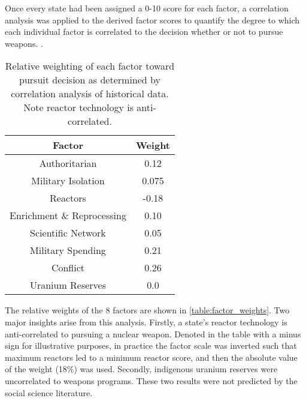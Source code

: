 Once every state had been assigned a 0-10 score for each factor, a correlation analysis was applied to the derived factor scores to quantify the degree to which each individual factor is correlated to the decision whether or not to pursue weapons. .  


\begin{table}
\centering
\begin{tabular}{|c|c|}
\hline
\textbf{Factor}        & \textbf{Weight} \\
\hline
Authoritarian   & 0.12 \\
Military Isolation & 0.075 \\
Reactors           & -0.18 \\
Enrichment \& Reprocessing & 0.10 \\
Scientific Network & 0.05 \\
Military Spending & 0.21 \\
Conflict  & 0.26 \\
Uranium Reserves &  0.0 \\
\hline
\end{tabular}
\caption{Relative weighting of each factor toward pursuit decision as determined by correlation analysis of historical data. Note reactor technology is anti-correlated.}
\label{tab:factor_weights}
\end{table}

The relative weights of the 8 factors are shown in \ref{table:factor_weights}.  Two major insights arise from this analysis. Firstly, a state's reactor technology is anti-correlated to pursuing a nuclear weapon.  Denoted in the table with a minus sign for illustrative purposes, in practice the factor scale was inverted such that maximum reactors led to a minimum reactor score, and then the absolute value of the weight (18\%) was used.  Secondly, indigenous uranium reserves were uncorrelated to weapons programs. These two results were not predicted by the social science literature.



\iffalse
\begin{figure}%
\begin{center}
\texttt{[image: ./figs/signatures\_table.pdf]}
\end{center}
\caption{Table of potential signatures across the fuel cycle: measureable through open, independent sources such as satellite imagery (green), available through official inspections (blue), or potentially unreliable due to physical or political constraints (yellow)\cite{kemp_environmental_2016,_plutonium_????,ferreira_radiometric_2012,stork_systematic_2006}.}
\label{fig:signatures}
\end{figure}
\fi

